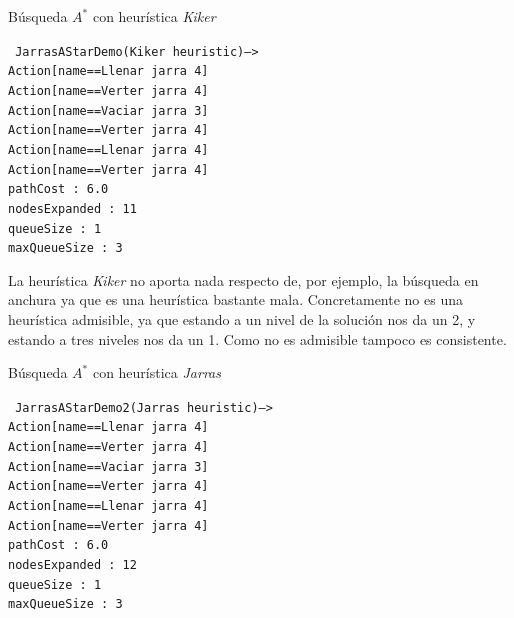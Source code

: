 \documentclass[11pt, a4paper, spanish, openright, twoside]{book}
\begin{document}
\begin{section}{Búsqueda $A^*$ con heurística \textit{Kiker}}

\texttt{
	JarrasAStarDemo(Kiker heuristic)-->	\\
	Action[name==Llenar jarra 4]		\\
	Action[name==Verter jarra 4]		\\
	Action[name==Vaciar jarra 3]		\\
	Action[name==Verter jarra 4]		\\
	Action[name==Llenar jarra 4]		\\
	Action[name==Verter jarra 4]		\\
	pathCost : 6.0					\\
	nodesExpanded : 11			\\
	queueSize : 1					\\
	maxQueueSize : 3				
}

La heurística  \textit{Kiker} no aporta nada respecto de, por ejemplo, la búsqueda en anchura ya que es una heurística bastante mala. Concretamente no es 
una heurística admisible, ya que estando a un nivel de la solución nos da un 2, y estando a tres niveles nos da un 1. Como no es admisible tampoco es consistente.


\end{section}
\begin{section}{Búsqueda $A^*$ con heurística \textit{Jarras}}

\texttt{
	JarrasAStarDemo2(Jarras heuristic)-->	\\
	Action[name==Llenar jarra 4]		\\
	Action[name==Verter jarra 4]		\\
	Action[name==Vaciar jarra 3]		\\
	Action[name==Verter jarra 4]		\\
	Action[name==Llenar jarra 4]		\\
	Action[name==Verter jarra 4]		\\
	pathCost : 6.0					\\
	nodesExpanded : 12			\\
	queueSize : 1					\\
	maxQueueSize : 3				
}

\end{section}
\end{document}
